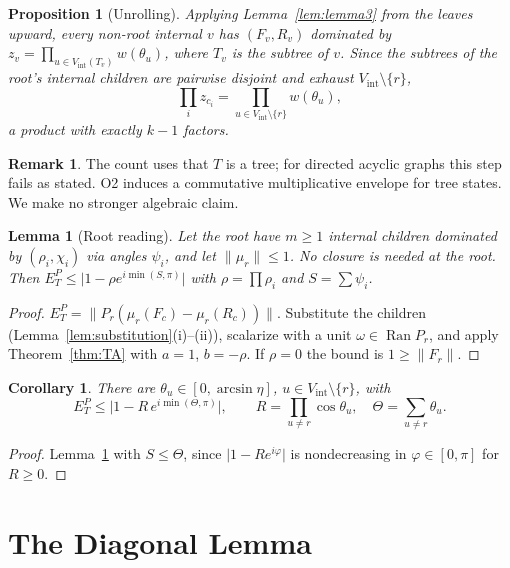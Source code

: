 \documentclass[11pt]{amsart}
\newtheorem{lemma}[theorem]{Lemma}
\newtheorem{proposition}[theorem]{Proposition}
\newtheorem{corollary}[theorem]{Corollary}
\theoremstyle{definition}
\newtheorem*{remark}{Remark}
\newcommand{\Vint}{V_{\mathrm{int}}}
\newcommand{\Ran}{\operatorname{Ran}}
\newcommand{\norm}[1]{\lVert #1\rVert}
\newcommand{\abs}[1]{\lvert #1\rvert}
\begin{document}
\begin{proposition}[Unrolling]\label{prop:unroll}
Applying Lemma~\ref{lem:lemma3} from the leaves upward, every non-root internal $v$
has $(F_v,R_v)$ dominated by $z_v=\prod_{u\in\Vint(T_v)}w(\theta_u)$, where $T_v$ is the
subtree of $v$. Since the subtrees of the root's internal children are pairwise
disjoint and exhaust $\Vint\setminus\{r\}$,
\[
\prod_iz_{c_i}=\prod_{u\in\Vint\setminus\{r\}}w(\theta_u),
\]
a product with exactly $k-1$ factors.
\end{proposition}

\begin{remark}
The count uses that $T$ is a tree; for directed acyclic graphs this step fails as
stated. O2 induces a commutative multiplicative envelope for tree states. We make
no stronger algebraic claim.
\end{remark}

\begin{lemma}[Root reading]\label{lem:root}
Let the root have $m\ge1$ internal children dominated by $(\rho_i,\chi_i)$ via
angles $\psi_i$, and let $\norm{\mu_r}\le1$. No closure is needed at the root. Then
$E^P_T\le\abs{1-\rho e^{i\min(S,\pi)}}$ with $\rho=\prod\rho_i$ and $S=\sum\psi_i$.
\end{lemma}

\begin{proof}
$E^P_T=\norm{P_r(\mu_r(F_c)-\mu_r(R_c))}$. Substitute the children
(Lemma~\ref{lem:substitution}(i)--(ii)), scalarize with a unit $\omega\in\Ran P_r$, and
apply Theorem~\ref{thm:TA} with $a=1$, $b=-\rho$. If $\rho=0$ the bound is
$1\ge\norm{F_r}$.
\end{proof}

\begin{corollary}\label{cor:envelope}
There are $\theta_u\in[0,\arcsin\eta]$, $u\in\Vint\setminus\{r\}$, with
\[
E^P_T\le\bigl|1-R\,e^{i\min(\Theta,\pi)}\bigr|,\qquad R=\prod_{u\ne r}\cos\theta_u,\quad\Theta=\sum_{u\ne r}\theta_u.
\]
\end{corollary}

\begin{proof}
Lemma~\ref{lem:root} with $S\le\Theta$, since $\abs{1-Re^{i\varphi}}$ is
nondecreasing in $\varphi\in[0,\pi]$ for $R\ge0$.
\end{proof}

\section{The Diagonal Lemma}\label{sec:diagonal}
\end{document}

